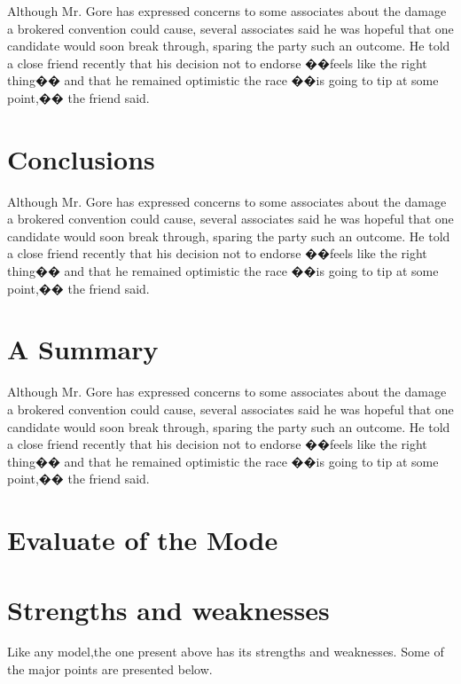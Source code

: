 Although Mr. Gore has expressed concerns to some associates about
the damage a brokered convention could cause, several associates
said he was hopeful that one candidate would soon break through,
sparing the party such an outcome. He told a close friend recently
that his decision not to endorse ��feels like the right thing��
and that he remained optimistic the race ��is going to tip at some
point,�� the friend said.

\section{Conclusions}
Although Mr. Gore has expressed concerns to some associates about
the damage a brokered convention could cause, several associates
said he was hopeful that one candidate would soon break through,
sparing the party such an outcome. He told a close friend recently
that his decision not to endorse ��feels like the right thing��
and that he remained optimistic the race ��is going to tip at some
point,�� the friend said.
\section{A Summary    }
Although Mr. Gore has expressed concerns to some associates about
the damage a brokered convention could cause, several associates
said he was hopeful that one candidate would soon break through,
sparing the party such an outcome. He told a close friend recently
that his decision not to endorse ��feels like the right thing��
and that he remained optimistic the race ��is going to tip at some
point,�� the friend said.
\section{Evaluate of the Mode}

\section{Strengths and weaknesses}
Like any model,the one present above has its strengths and
weaknesses. Some of the major points are presented below.

